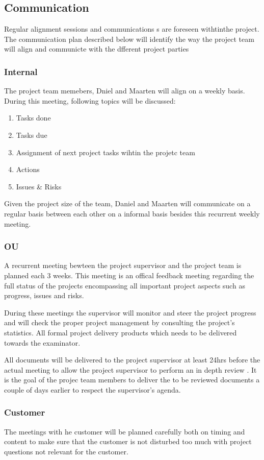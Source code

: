 \subsection{Communication}
Regular alignment sessions and communications s are foreseen withtinthe project. The communication plan described below will identify the way the project team will align and communicte with the dfferent project parties

\subsubsection{Internal}
The project team memebers, Dniel and Maarten will align on a weekly basis.
During this meeting, following topics will be discussed:
\begin{enumerate}
	\item Tasks done
	\item Tasks due
	\item Assignment of next project tasks wihtin the projetc team
	\item Actions
	\item Issues & Risks
\end {enumerate}
Given the project size of the team, Daniel and Maarten will communicate on a regular basis between each other on a informal basis besides this recurrent weekly meeting.
\subsubsection{OU}
A recurrent meeting bewteen the project supervisor and the project team is planned each 3 weeks.
This meeting is an offical feedback meeting regarding the full status of the projects encompassing all important project aspects such as progress, issues and risks. 

During these meetings the supervisor will monitor and steer the project progress and will check the proper project management by consulting the project's statistics. All formal project delivery products which needs to be delivered towards the examinator. 

All documents will be delivered to the project supervisor at least 24hrs before the actual meeting to allow the project supervisor to perform an in depth review .
It is the goal of the projec team members to deliver the to be reviewed documents a couple of days earlier to respect the supervisor's agenda.

\subsubsection{Customer}
The meetings with he customer will be planned carefully both on timing and content to make sure that the customer is not disturbed too much with project questions not relevant for the customer. 

